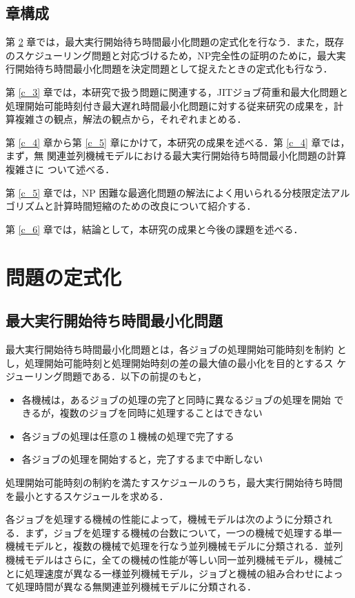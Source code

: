 \documentclass[12pt]{optlab-bachelor}
\begin{document}
\section{章構成}
第 \ref{c_2} 章では，最大実行開始待ち時間最小化問題の定式化を行なう．また，既存のスケジューリング問題と対応づけるため，NP完全性の証明のために，最大実行開始待ち時間最小化問題を決定問題として捉えたときの定式化も行なう．

第 \ref{c_3} 章では，本研究で扱う問題に関連する，JITジョブ荷重和最大化問題と
処理開始可能時刻付き最大遅れ時間最小化問題に対する従来研究の成果を，計
算複雑さの観点，解法の観点から，それぞれまとめる．

第 \ref{c_4} 章から第 \ref{c_5} 章にかけて，本研究の成果を述べる．第 \ref{c_4} 章では，まず，無
関連並列機械モデルにおける最大実行開始待ち時間最小化問題の計算複雑さに
ついて述べる．

第 \ref{c_5} 章では，NP 困難な最適化問題の解法によく用いられる分枝限定法アルゴリズムと計算時間短縮のための改良について紹介する．

第 \ref{c_6} 章では，結論として，本研究の成果と今後の課題を述べる．

\chapter{問題の定式化}\label{c_2}
\section{最大実行開始待ち時間最小化問題}
最大実行開始待ち時間最小化問題とは，各ジョブの処理開始可能時刻を制約
とし，処理開始可能時刻と処理開始時刻の差の最大値の最小化を目的とするス
ケジューリング問題である．以下の前提のもと，
\begin{itemize}
  \item 各機械は，あるジョブの処理の完了と同時に異なるジョブの処理を開始
  できるが，複数のジョブを同時に処理することはできない
  \item 各ジョブの処理は任意の１機械の処理で完了する
  \item 各ジョブの処理を開始すると，完了するまで中断しない
\end{itemize}
処理開始可能時刻の制約を満たすスケジュールのうち，最大実行開始待ち時間
を最小とするスケジュールを求める．

各ジョブを処理する機械の性能によって，機械モデルは次のように分類され
る．まず，ジョブを処理する機械の台数について，一つの機械で処理する単一
機械モデルと，複数の機械で処理を行なう並列機械モデルに分類される．並列
機械モデルはさらに，全ての機械の性能が等しい同一並列機械モデル，機械ご
とに処理速度が異なる一様並列機械モデル，ジョブと機械の組み合わせによっ
て処理時間が異なる無関連並列機械モデルに分類される．
\end{document}
